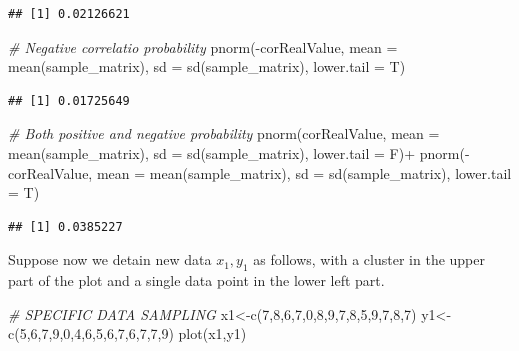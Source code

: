 \documentclass[
  notitlepage,
  onecolumn,
  openany]{book}
\newenvironment{Shaded}{\begin{snugshade}}{\end{snugshade}}
\newcommand{\AttributeTok}[1]{\textcolor[rgb]{0.77,0.63,0.00}{#1}}
\newcommand{\CommentTok}[1]{\textcolor[rgb]{0.56,0.35,0.01}{\textit{#1}}}
\newcommand{\DecValTok}[1]{\textcolor[rgb]{0.00,0.00,0.81}{#1}}
\newcommand{\FunctionTok}[1]{\textcolor[rgb]{0.00,0.00,0.00}{#1}}
\newcommand{\NormalTok}[1]{#1}
\newcommand{\OtherTok}[1]{\textcolor[rgb]{0.56,0.35,0.01}{#1}}
\newcommand{\SpecialCharTok}[1]{\textcolor[rgb]{0.00,0.00,0.00}{#1}}
\begin{document}
\begin{verbatim}
## [1] 0.02126621
\end{verbatim}

\begin{Shaded}
\begin{Highlighting}[]
\CommentTok{\# Negative correlatio probability}
\FunctionTok{pnorm}\NormalTok{(}\SpecialCharTok{{-}}\NormalTok{corRealValue, }\AttributeTok{mean =} \FunctionTok{mean}\NormalTok{(sample\_matrix), }
      \AttributeTok{sd =} \FunctionTok{sd}\NormalTok{(sample\_matrix), }\AttributeTok{lower.tail =}\NormalTok{ T)}
\end{Highlighting}
\end{Shaded}

\begin{verbatim}
## [1] 0.01725649
\end{verbatim}

\begin{Shaded}
\begin{Highlighting}[]
\CommentTok{\# Both positive and negative probability}
\FunctionTok{pnorm}\NormalTok{(corRealValue, }\AttributeTok{mean =} \FunctionTok{mean}\NormalTok{(sample\_matrix), }
      \AttributeTok{sd =} \FunctionTok{sd}\NormalTok{(sample\_matrix), }\AttributeTok{lower.tail =}\NormalTok{ F)}\SpecialCharTok{+}
  \FunctionTok{pnorm}\NormalTok{(}\SpecialCharTok{{-}}\NormalTok{corRealValue, }\AttributeTok{mean =} \FunctionTok{mean}\NormalTok{(sample\_matrix), }
        \AttributeTok{sd =} \FunctionTok{sd}\NormalTok{(sample\_matrix), }\AttributeTok{lower.tail =}\NormalTok{ T)}
\end{Highlighting}
\end{Shaded}

\begin{verbatim}
## [1] 0.0385227
\end{verbatim}

Suppose now we detain new data \(x_1, y_1\) as follows, with a cluster in the upper part of the plot and a single data point in the lower left part.

\begin{Shaded}
\begin{Highlighting}[]
\CommentTok{\# SPECIFIC DATA SAMPLING}
\NormalTok{x1}\OtherTok{\textless{}{-}}\FunctionTok{c}\NormalTok{(}\DecValTok{7}\NormalTok{,}\DecValTok{8}\NormalTok{,}\DecValTok{6}\NormalTok{,}\DecValTok{7}\NormalTok{,}\DecValTok{0}\NormalTok{,}\DecValTok{8}\NormalTok{,}\DecValTok{9}\NormalTok{,}\DecValTok{7}\NormalTok{,}\DecValTok{8}\NormalTok{,}\DecValTok{5}\NormalTok{,}\DecValTok{9}\NormalTok{,}\DecValTok{7}\NormalTok{,}\DecValTok{8}\NormalTok{,}\DecValTok{7}\NormalTok{)}
\NormalTok{y1}\OtherTok{\textless{}{-}}\FunctionTok{c}\NormalTok{(}\DecValTok{5}\NormalTok{,}\DecValTok{6}\NormalTok{,}\DecValTok{7}\NormalTok{,}\DecValTok{9}\NormalTok{,}\DecValTok{0}\NormalTok{,}\DecValTok{4}\NormalTok{,}\DecValTok{6}\NormalTok{,}\DecValTok{5}\NormalTok{,}\DecValTok{6}\NormalTok{,}\DecValTok{7}\NormalTok{,}\DecValTok{6}\NormalTok{,}\DecValTok{7}\NormalTok{,}\DecValTok{7}\NormalTok{,}\DecValTok{9}\NormalTok{)}
\FunctionTok{plot}\NormalTok{(x1,y1)}
\end{Highlighting}
\end{Shaded}
\end{document}
